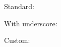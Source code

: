\documentclass{article}
\begin{document}
\noindent Standard: 

\noindent With underscore: 

\renewcommand{\doitext}{DOI:\ }
\renewcommand{\doiurl}{https://dx.doi.org/}
\noindent Custom: 
\end{document}
